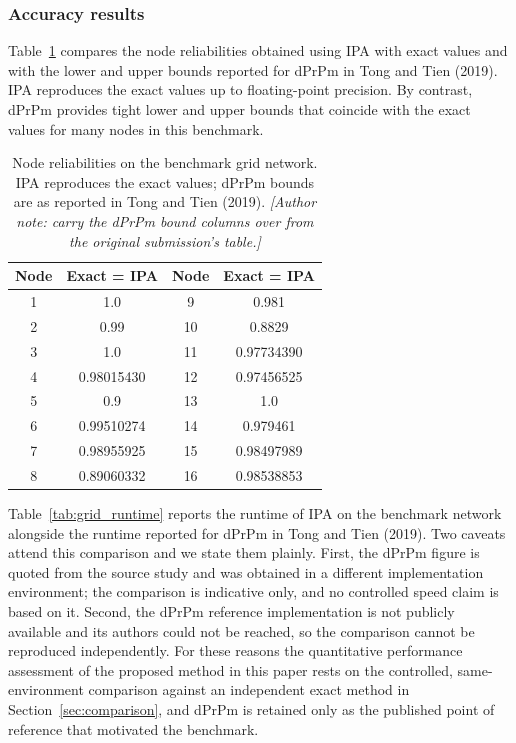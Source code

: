 \documentclass[preprint,12pt]{elsarticle}
\theoremstyle{definition}
\begin{document}
\subsubsection{Accuracy results}

Table~\ref{tab:grid_accuracy} compares the node reliabilities obtained using IPA with exact values and
with the lower and upper bounds reported for dPrPm in Tong and Tien (2019). IPA reproduces the exact
values up to floating-point precision. By contrast, dPrPm provides tight lower and upper bounds that
coincide with the exact values for many nodes in this benchmark.

\begin{table}[t]
\centering\small
\caption{Node reliabilities on the benchmark grid network. IPA reproduces the exact values; dPrPm bounds
are as reported in Tong and Tien (2019). \emph{[Author note: carry the dPrPm bound columns over from the
original submission's table.]}}
\label{tab:grid_accuracy}
\begin{tabular}{cc@{\qquad}cc}
\toprule
Node & Exact = IPA & Node & Exact = IPA\\
\midrule
1 & 1.0 & 9 & 0.981\\
2 & 0.99 & 10 & 0.8829\\
3 & 1.0 & 11 & 0.97734390\\
4 & 0.98015430 & 12 & 0.97456525\\
5 & 0.9 & 13 & 1.0\\
6 & 0.99510274 & 14 & 0.979461\\
7 & 0.98955925 & 15 & 0.98497989\\
8 & 0.89060332 & 16 & 0.98538853\\
\bottomrule
\end{tabular}
\end{table}

Table~\ref{tab:grid_runtime} reports the runtime of IPA on the benchmark network alongside the runtime
reported for dPrPm in Tong and Tien (2019). Two caveats attend this comparison and we state them
plainly. First, the dPrPm figure is quoted from the source study and was obtained in a different
implementation environment; the comparison is indicative only, and no controlled speed claim is based on
it. Second, the dPrPm reference implementation is not publicly available and its authors could not be
reached, so the comparison cannot be reproduced independently. For these reasons the quantitative
performance assessment of the proposed method in this paper rests on the controlled, same-environment
comparison against an independent exact method in Section~\ref{sec:comparison}, and dPrPm is retained
only as the published point of reference that motivated the benchmark.
\end{document}
